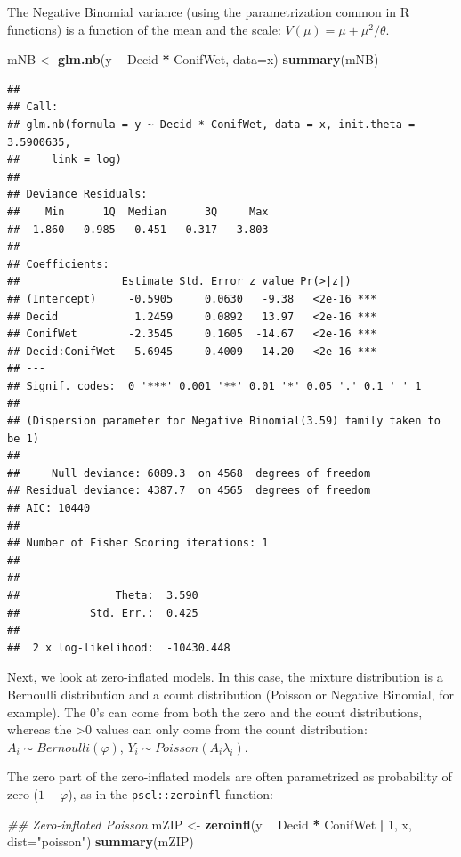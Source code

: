 \documentclass[12pt,]{book}
\newenvironment{Shaded}{\begin{snugshade}}{\end{snugshade}}
\newcommand{\CommentTok}[1]{\textcolor[rgb]{0.56,0.35,0.01}{\textit{#1}}}
\newcommand{\DataTypeTok}[1]{\textcolor[rgb]{0.13,0.29,0.53}{#1}}
\newcommand{\DecValTok}[1]{\textcolor[rgb]{0.00,0.00,0.81}{#1}}
\newcommand{\KeywordTok}[1]{\textcolor[rgb]{0.13,0.29,0.53}{\textbf{#1}}}
\newcommand{\NormalTok}[1]{#1}
\newcommand{\OperatorTok}[1]{\textcolor[rgb]{0.81,0.36,0.00}{\textbf{#1}}}
\newcommand{\StringTok}[1]{\textcolor[rgb]{0.31,0.60,0.02}{#1}}
\begin{document}
The Negative Binomial variance (using the parametrization common in R functions)
is a function of the mean and the scale: \(V(\mu) = \mu + \mu^2/\theta\).

\begin{Shaded}
\begin{Highlighting}[]
\NormalTok{mNB <-}\StringTok{ }\KeywordTok{glm.nb}\NormalTok{(y }\OperatorTok{~}\StringTok{ }\NormalTok{Decid }\OperatorTok{*}\StringTok{ }\NormalTok{ConifWet, }\DataTypeTok{data=}\NormalTok{x)}
\KeywordTok{summary}\NormalTok{(mNB)}
\end{Highlighting}
\end{Shaded}

\begin{verbatim}
## 
## Call:
## glm.nb(formula = y ~ Decid * ConifWet, data = x, init.theta = 3.5900635, 
##     link = log)
## 
## Deviance Residuals: 
##    Min      1Q  Median      3Q     Max  
## -1.860  -0.985  -0.451   0.317   3.803  
## 
## Coefficients:
##                Estimate Std. Error z value Pr(>|z|)    
## (Intercept)     -0.5905     0.0630   -9.38   <2e-16 ***
## Decid            1.2459     0.0892   13.97   <2e-16 ***
## ConifWet        -2.3545     0.1605  -14.67   <2e-16 ***
## Decid:ConifWet   5.6945     0.4009   14.20   <2e-16 ***
## ---
## Signif. codes:  0 '***' 0.001 '**' 0.01 '*' 0.05 '.' 0.1 ' ' 1
## 
## (Dispersion parameter for Negative Binomial(3.59) family taken to be 1)
## 
##     Null deviance: 6089.3  on 4568  degrees of freedom
## Residual deviance: 4387.7  on 4565  degrees of freedom
## AIC: 10440
## 
## Number of Fisher Scoring iterations: 1
## 
## 
##               Theta:  3.590 
##           Std. Err.:  0.425 
## 
##  2 x log-likelihood:  -10430.448
\end{verbatim}

Next, we look at zero-inflated models.
In this case, the mixture distribution is a Bernoulli distribution
and a count distribution (Poisson or Negative Binomial, for example).
The 0's can come from both the zero and the count distributions,
whereas the \textgreater{}0 values can only come from the count distribution:
\(A_i \sim Bernoulli(\varphi)\), \(Y_i \sim Poisson(A_i \lambda_i)\).

The zero part of the zero-inflated models are often parametrized
as probability of zero (\(1-\varphi\)), as in the \texttt{pscl::zeroinfl} function:

\begin{Shaded}
\begin{Highlighting}[]
\CommentTok{## Zero-inflated Poisson}
\NormalTok{mZIP <-}\StringTok{ }\KeywordTok{zeroinfl}\NormalTok{(y }\OperatorTok{~}\StringTok{ }\NormalTok{Decid }\OperatorTok{*}\StringTok{ }\NormalTok{ConifWet }\OperatorTok{|}\StringTok{ }\DecValTok{1}\NormalTok{, x, }\DataTypeTok{dist=}\StringTok{"poisson"}\NormalTok{)}
\KeywordTok{summary}\NormalTok{(mZIP)}
\end{Highlighting}
\end{Shaded}
\end{document}

